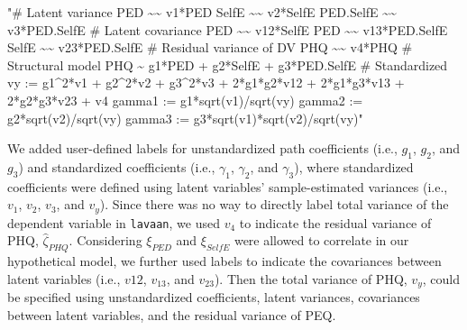 \documentclass[
  man]{apa7}
\newenvironment{Shaded}{\begin{snugshade}}{\end{snugshade}}
\newcommand{\StringTok}[1]{\textcolor[rgb]{0.31,0.60,0.02}{#1}}
\begin{document}
\begin{Shaded}
\begin{Highlighting}[]
\StringTok{"\# Latent variance}
\StringTok{   PED \textasciitilde{}\textasciitilde{} v1*PED}
\StringTok{   SelfE \textasciitilde{}\textasciitilde{} v2*SelfE}
\StringTok{   PED.SelfE \textasciitilde{}\textasciitilde{} v3*PED.SelfE}
\StringTok{ \# Latent covariance}
\StringTok{   PED \textasciitilde{}\textasciitilde{} v12*SelfE}
\StringTok{   PED \textasciitilde{}\textasciitilde{} v13*PED.SelfE}
\StringTok{   SelfE \textasciitilde{}\textasciitilde{} v23*PED.SelfE}
\StringTok{ \# Residual variance of DV}
\StringTok{   PHQ \textasciitilde{}\textasciitilde{} v4*PHQ}
\StringTok{ \# Structural model}
\StringTok{   PHQ \textasciitilde{} g1*PED + g2*SelfE + g3*PED.SelfE}
\StringTok{ \# Standardized}
\StringTok{   vy := g1\^{}2*v1 + g2\^{}2*v2 + g3\^{}2*v3 + 2*g1*g2*v12 + }
\StringTok{         2*g1*g3*v13 + 2*g2*g3*v23 + v4}
\StringTok{   gamma1 := g1*sqrt(v1)/sqrt(vy)}
\StringTok{   gamma2 := g2*sqrt(v2)/sqrt(vy)}
\StringTok{   gamma3 := g3*sqrt(v1)*sqrt(v2)/sqrt(vy)"}
\end{Highlighting}
\end{Shaded}

We added user-defined labels for unstandardized path coefficients (i.e., \(g_{1}\), \(g_{2}\), and \(g_{3}\)) and standardized coefficients (i.e., \(\gamma_{1}\), \(\gamma_{2}\), and \(\gamma_{3}\)), where standardized coefficients were defined using latent variables' sample-estimated variances (i.e., \(v_{1}\), \(v_{2}\), \(v_{3}\), and \(v_{y}\)). Since there was no way to directly label total variance of the dependent variable in \texttt{lavaan}, we used \(v_{4}\) to indicate the residual variance of PHQ, \(\hat{\zeta}_{PHQ}\). Considering \(\xi_{PED}\) and \(\xi_{SelfE}\) were allowed to correlate in our hypothetical model, we further used labels to indicate the covariances between latent variables (i.e., \(v12\), \(v_{13}\), and \(v_{23}\)). Then the total variance of PHQ, \(v_{y}\), could be specified using unstandardized coefficients, latent variances, covariances between latent variables, and the residual variance of PEQ.
\end{document}
